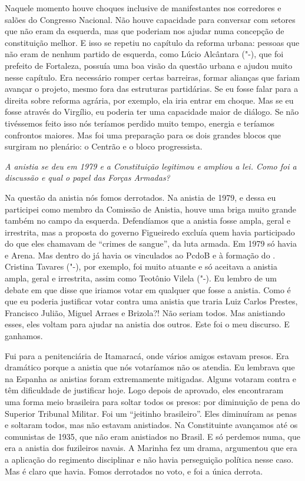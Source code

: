 Naquele momento houve choques inclusive de
manifestantes nos corredores e salões do Congresso Nacional. Não houve
capacidade para conversar com setores que não eram da esquerda, mas que
poderiam nos ajudar numa concepção de constituição melhor. E isso se
repetiu no capítulo da reforma urbana: pessoas que não eram de nenhum
partido de esquerda, como Lúcio Alcântara ("-), que foi prefeito de
Fortaleza, possuía uma boa visão da questão urbana e ajudou muito nesse
capítulo. Era necessário romper certas barreiras, formar alianças que
fariam avançar o projeto, mesmo fora das estruturas partidárias. Se eu
fosse falar para a direita sobre reforma agrária, por exemplo, ela iria
entrar em choque. Mas se eu fosse através do Virgílio, eu poderia ter
uma capacidade maior de diálogo. Se não tivéssemos feito isso nós
teríamos perdido muito tempo, energia e teríamos confrontos maiores. Mas
foi uma preparação para os dois grandes blocos que surgiram no plenário:
o Centrão e o bloco progressista.

\medskip

\emph{A anistia se deu em 1979 e a Constituição legitimou e ampliou a
lei. Como foi a discussão e qual o papel das Forças Armadas?}

Na questão da anistia nós fomos derrotados. Na anistia
de 1979, e dessa eu participei como membro da Comissão de Anistia, houve
uma briga muito grande também no campo da esquerda. Defendíamos que a
anistia fosse ampla, geral e irrestrita, mas a proposta do governo
Figueiredo excluía quem havia participado do que eles chamavam de
``crimes de sangue'', da luta armada. Em 1979 só havia  e Arena. Mas
dentro do  já havia os vinculados ao PcdoB e à formação do .
Cristina Tavares ("-), por exemplo, foi muito atuante e só aceitava
a anistia ampla, geral e irrestrita, assim como Teotônio Vilela
("-). Eu lembro de um debate em que disse que iriamos votar em
qualquer que fosse a anistia. Como é que eu poderia justificar votar
contra uma anistia que traria Luiz Carlos Prestes, Francisco Julião,
Miguel Arraes e Brizola?! Não seriam todos. Mas anistiando esses, eles
voltam para ajudar na anistia dos outros. Este foi o meu discurso. E
ganhamos.

Fui para a penitenciária de Itamaracá, onde vários amigos estavam
presos. Era dramático porque a anistia que nós votaríamos não os
atendia. Eu lembrava que na Espanha as anistias foram extremamente
mitigadas. Alguns votaram contra e têm dificuldade de justificar hoje.
Logo depois de aprovado, eles encontraram uma forma meio brasileira para
soltar todos os presos: por diminuição de pena do Superior Tribunal
Militar. Foi um ``jeitinho brasileiro''. Eles diminuíram as penas e
soltaram todos, mas não estavam anistiados. Na Constituinte avançamos
até os comunistas de 1935, que não eram anistiados no Brasil. E só
perdemos numa, que era a anistia dos fuzileiros navais. A Marinha fez um
drama, argumentou que era a aplicação do regimento disciplinar e não
havia perseguição política nesse caso. Mas é claro que havia. Fomos
derrotados no voto, e foi a única derrota.

